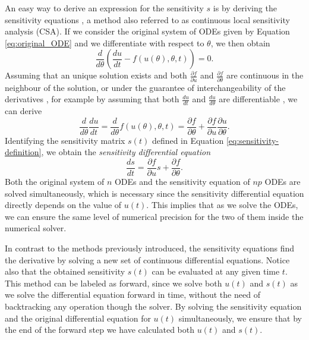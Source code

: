 An easy way to derive an expression for the sensitivity $s$ is by deriving the sensitivity equations \cite{ramsay2017dynamic}, a method also referred to as continuous local sensitivity analysis (CSA). 
If we consider the original system of ODEs given by Equation \eqref{eq:original_ODE} and we differentiate with respect to $\theta$, we then obtain
\begin{equation}
    \frac{d}{d\theta} \left( \frac{du}{dt}  - f(u(\theta), \theta, t) \right) = 0.
\end{equation}
Assuming that an unique solution exists and both $\frac{\partial f}{\partial u}$ and $\frac{\partial f}{\partial \theta}$ are continuous in the neighbour of the solution, or under the guarantee of interchangeability of the derivatives \cite{gronwall1919note}, for example by assuming that both $\frac{du}{dt}$ and $\frac{du}{d\theta}$ are differentiable \cite{math8111947}, we can derive
\begin{equation}
 \frac{d}{d\theta} \frac{du}{dt} 
 =
 \frac{d}{d\theta} f(u(\theta), \theta, t)
 = 
 \frac{\partial f}{\partial \theta}
 + 
 \frac{\partial f}{\partial u} \frac{\partial u}{\partial \theta}.
\end{equation}
Identifying the sensitivity matrix $s(t)$ defined in Equation \eqref{eq:sensitivity-definition}, we obtain the \textit{sensitivity differential equation} 
\begin{equation}
 \frac{ds}{dt} = \frac{\partial f}{\partial u} s + \frac{\partial f}{\partial \theta}.
 \label{eq:sensitivity_equations}
\end{equation}
Both the original system of $n$ ODEs and the sensitivity equation of $np$ ODEs are solved simultaneously, which is necessary since the sensitivity differential equation directly depends on the value of $u(t)$.  
This implies that as we solve the ODEs, we can ensure the same level of numerical precision for the two of them inside the numerical solver.

In contrast to the methods previously introduced, the sensitivity equations find the derivative by solving a new set of continuous differential equations.
Notice also that the obtained sensitivity $s(t)$ can be evaluated at any given time $t$. 
This method can be labeled as forward, since we solve both $u(t)$ and $s(t)$ as we solve the differential equation forward in time, without the need of backtracking any operation though the solver.
By solving the sensitivity equation and the original differential equation for $u(t)$ simultaneously, we ensure that by the end of the forward step we have calculated both $u(t)$ and $s(t)$. 